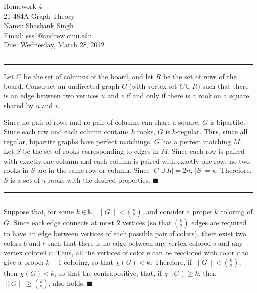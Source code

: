 \documentclass[11pt]{article}
\makeatletter
\newcounter{questionCounter}
\newcounter{partCounter}[questionCounter]
\newenvironment{question}[2][\arabic{questionCounter}]{%
    \setcounter{partCounter}{0}%
    \vspace{.25in} \hrule \vspace{0.5em}%
        \noindent{\bf #2}%
    \vspace{0.8em} \hrule \vspace{.10in}%
    \addtocounter{questionCounter}{1}%
}{}
\newcommand{\myname}{Shashank Singh}
\newcommand{\myandrew}{sss1@andrew.cmu.edu}
\newcommand{\myclass}{21-484A Graph Theory}
\newcommand{\myhwnum}{4}
\newcommand{\duedate}{Wednesday, March 28, 2012}
\renewcommand{\qed}{\quad $\blacksquare$}
\makeatother
\begin{document}
\thispagestyle{plain}

{\Large Homework \myhwnum} \\
\myclass \\
Name: \myname \\
Email: \myandrew \\
Due: \duedate
\begin{question}{Problem 1}
Let $C$ be the set of columns of the board, and let $R$ be the set of rows of
the board. Construct an undirected graph $G$ (with vertex set $C \cup R$)
such that there is an edge between two vertices $u$ and $v$ if and only if
there is a rook on a square shared by $u$ and $v$.

Since no pair of rows and no pair of columns can share a square, $G$ is
bipartite. Since each row and each column contains $k$ rooks, $G$ is
$k$-regular. Thus, since all regular, bipartite graphs have perfect matchings,
$G$ has a perfect matching $M$. Let $S$ be the set of rooks corresponding to
edges in $M$. Since each row is paired with exactly one column and each column
is paired with exactly one row, no two rooks in $S$ are in the same row or
column. Since $|C \cup R| = 2n$, $|S| = n$. Therefore, $S$ is a set of $n$
rooks with the desired properties. \qed
\end{question}

\begin{question}{Problem 3}
Suppose that, for some $k \in \mathbb{N}$, $\|G\| < {k \choose 2}$, and
consider a proper $k$ coloring of $G$. Since each edge connects at most $2$
vertices (so that $k \choose 2$ edges are required to have an edge between
vertices of each possible pair of colors), there exist two colors $b$ and $r$
such that there is no edge between any vertex colored $b$ and any vertex
colored $r$. Thus, all the vertices of color $b$ can be recolored with color
$r$ to give a proper $k - 1$ coloring, so that $\chi(G) < k$. Therefore, if
$\|G\| < {k \choose 2}$, then $\chi(G) < k$, so that the contrapositive, that,
if $\chi(G) \geq k$, then $\|G\| \geq {k \choose 2}$, also holds. \qed
\end{question}
\end{document}
